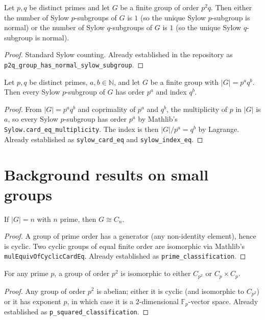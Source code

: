 \begin{lemma}
    \label{lem:p2q-normal-sylow}
    Let $p, q$ be distinct primes and let $G$ be a finite group of order
    $p^2 q$. Then either the number of Sylow $p$-subgroups of $G$ is $1$ (so
    the unique Sylow $p$-subgroup is normal) or the number of Sylow
    $q$-subgroups of $G$ is $1$ (so the unique Sylow $q$-subgroup is normal).
\end{lemma}
\begin{proof}
    Standard Sylow counting. Already established in the repository as
    \texttt{p2q\_group\_has\_normal\_sylow\_subgroup}.
\end{proof}

\begin{lemma}
    \label{lem:sylow-card-index}
    Let $p, q$ be distinct primes, $a, b \in \mathbb{N}$, and let $G$ be a
    finite group with $|G| = p^a q^b$. Then every Sylow $p$-subgroup of $G$
    has order $p^a$ and index $q^b$.
\end{lemma}
\begin{proof}
    From $|G| = p^a q^b$ and coprimality of $p^a$ and $q^b$, the multiplicity
    of $p$ in $|G|$ is $a$, so every Sylow $p$-subgroup has order $p^a$ by
    Mathlib's \texttt{Sylow.card\_eq\_multiplicity}. The index is then
    $|G|/p^a = q^b$ by Lagrange. Already established as
    \texttt{sylow\_card\_eq} and \texttt{sylow\_index\_eq}.
\end{proof}

\section{Background results on small groups}

\begin{lemma}
    \label{lem:prime-classification}
    If $|G| = n$ with $n$ prime, then $G \cong C_n$.
\end{lemma}
\begin{proof}
    A group of prime order has a generator (any non-identity element), hence
    is cyclic. Two cyclic groups of equal finite order are isomorphic via
    Mathlib's \texttt{mulEquivOfCyclicCardEq}. Already established as
    \texttt{prime\_classification}.
\end{proof}

\begin{lemma}
    \label{lem:p-squared-classification}
    For any prime $p$, a group of order $p^2$ is isomorphic to either
    $C_{p^2}$ or $C_p \times C_p$.
\end{lemma}
\begin{proof}
    Any group of order $p^2$ is abelian; either it is cyclic (and isomorphic
    to $C_{p^2}$) or it has exponent $p$, in which case it is a $2$-dimensional
    $\mathbb{F}_p$-vector space. Already established as
    \texttt{p\_squared\_classification}.
\end{proof}

